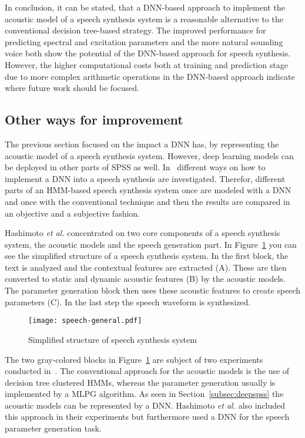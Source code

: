 In conclusion, it can be stated, that a \ac{DNN}-based approach to implement the acoustic model
of a speech synthesis system is a reasonable alternative to the conventional decision tree-based strategy. The improved performance for predicting spectral and excitation parameters and the more natural sounding voice both show the potential of the \ac{DNN}-based approach for speech synthesis. However, the higher computational costs both at training and prediction stage due to more complex arithmetic operations in the \ac{DNN}-based approach indicate where future work should be focused.

\subsection{Other ways for improvement}
\label{subsec:deepeffect}

The previous section focused on the impact a \ac{DNN} has, by representing the acoustic model of a speech synthesis system. However, deep learning models can be deployed in other parts of \ac{SPSS} as well. In~\cite{hashimoto:effect} different ways on how to implement a \ac{DNN} into a speech synthesis are investigated. Therefor, different parts of an \ac{HMM}-based speech synthesis system once are modeled with a \ac{DNN} and once with the conventional technique and then the results are compared in an objective and a subjective fashion.

Hashimoto \textit{et al.} concentrated on two core components of a speech synthesis system, the acoustic models and the speech generation part. In Figure~\ref{fig:generalspeech} you can see the simplified structure of a speech synthesis system. In the first block, the text is analyzed and the contextual features are extracted (A). These are then converted to static and dynamic acoustic features (B) by the acoustic models. The parameter generation block then uses these acoustic features to create speech parameters (C). In the last step the speech waveform is synthesized.

\begin{figure}[h]
	\texttt{[image: speech-general.pdf]}
	\caption{Simplified structure of speech synthesis system~\cite{hashimoto:effect}}
	\label{fig:generalspeech}
\end{figure}

The two gray-colored blocks in Figure~\ref{fig:generalspeech} are subject of two experiments conducted in~\cite{hashimoto:effect}. The conventional approach for the acoustic models is the use of decision tree clustered \acp{HMM}, whereas the parameter generation usually is implemented by a \ac{MLPG} algorithm. As seen in Section~\ref{subsec:deepspss} the acoustic models can be represented by a \ac{DNN}. Hashimoto \textit{et al.} also included this approach in their experiments but furthermore used a \ac{DNN} for the speech parameter generation task.

